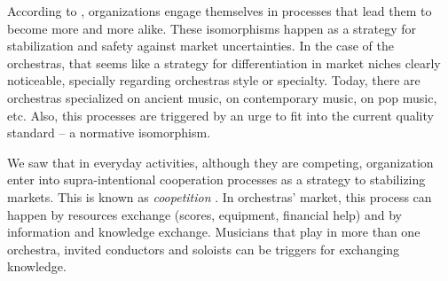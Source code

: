 \documentclass[a4paper, 12pt, openright, oneside, german, french, brazil, english]{abntex2}
\begin{document}
	
	According to , organizations engage themselves in processes that lead them to become more and more alike. These isomorphisms happen as a strategy for stabilization and safety against market uncertainties. In the case of the orchestras, that seems like a strategy for differentiation in market niches clearly noticeable, specially regarding orchestras style or specialty. Today, there are orchestras specialized on ancient music, on contemporary music, on pop music, etc. Also, this processes are triggered by an urge to fit into the current quality standard -- a normative isomorphism.
	
	
	We saw that in everyday activities, although they are competing, organization enter into supra-intentional cooperation processes as a strategy to stabilizing markets. This is known as \textit{coopetition} \cite{lazega2009theorie}. In orchestras' market, this process can happen by resources exchange (scores, equipment, financial help) and by information and knowledge exchange. Musicians that play in more than one orchestra, invited conductors and soloists can be triggers for exchanging knowledge.
	
	
\end{document}
